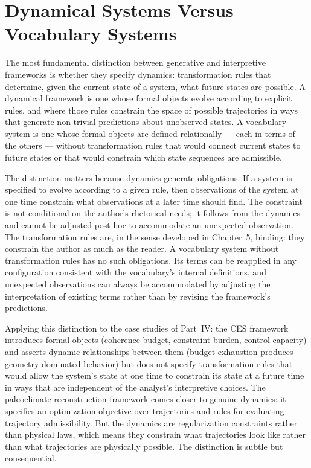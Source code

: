 \documentclass[12pt, openright, twoside]{book}
\begin{document}
\section{Dynamical Systems Versus Vocabulary Systems}

The most fundamental distinction between generative and interpretive
frameworks is whether they specify dynamics: transformation rules that
determine, given the current state of a system, what future states are
possible. A dynamical framework is one whose formal objects evolve according
to explicit rules, and where those rules constrain the space of possible
trajectories in ways that generate non-trivial predictions about unobserved
states. A vocabulary system is one whose formal objects are defined
relationally --- each in terms of the others --- without transformation
rules that would connect current states to future states or that would
constrain which state sequences are admissible.

The distinction matters because dynamics generate obligations. If a system
is specified to evolve according to a given rule, then observations of the
system at one time constrain what observations at a later time should find.
The constraint is not conditional on the author's rhetorical needs; it follows
from the dynamics and cannot be adjusted post hoc to accommodate an unexpected
observation. The transformation rules are, in the sense developed in
Chapter~5, binding: they constrain the author as much as the reader. A
vocabulary system without transformation rules has no such obligations.
Its terms can be reapplied in any configuration consistent with the
vocabulary's internal definitions, and unexpected observations can always
be accommodated by adjusting the interpretation of existing terms rather
than by revising the framework's predictions.

Applying this distinction to the case studies of Part~IV: the CES framework
introduces formal objects (coherence budget, constraint burden, control
capacity) and asserts dynamic relationships between them (budget exhaustion
produces geometry-dominated behavior) but does not specify transformation
rules that would allow the system's state at one time to constrain its
state at a future time in ways that are independent of the analyst's
interpretive choices. The paleoclimate reconstruction framework comes
closer to genuine dynamics: it specifies an optimization objective over
trajectories and rules for evaluating trajectory admissibility. But the
dynamics are regularization constraints rather than physical laws, which
means they constrain what trajectories look like rather than what
trajectories are physically possible. The distinction is subtle but
consequential.
\end{document}
